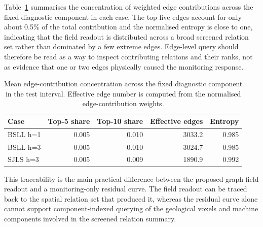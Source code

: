 Table~\ref{tab:edge_concentration} summarises the concentration of weighted
edge contributions across the fixed diagnostic component in each case. The
top five edges account for only about 0.5\% of the total contribution and the
normalised entropy is close to one, indicating that the field readout is
distributed across a broad screened relation set rather than dominated by a
few extreme edges. Edge-level query should therefore be read as a way to
inspect contributing relations and their ranks, not as evidence that one or
two edges physically caused the monitoring response.

\begin{table}[htbp]
\centering
\caption{Mean edge-contribution concentration across the fixed diagnostic
component in the test interval. Effective edge number is computed from the
normalised edge-contribution weights.}
\label{tab:edge_concentration}
\scriptsize
\setlength{\tabcolsep}{4pt}
\begin{tabular}{lrrrr}
\toprule
Case & Top-5 share & Top-10 share & Effective edges & Entropy \\
\midrule
BSLL h=1 & 0.005 & 0.010 & 3033.2 & 0.985 \\
BSLL h=3 & 0.005 & 0.010 & 3024.7 & 0.985 \\
SJLS h=3 & 0.005 & 0.009 & 1890.9 & 0.992 \\
\bottomrule
\end{tabular}
\end{table}

This traceability is the main practical difference between the proposed graph
field readout and a monitoring-only residual curve. The field readout can be
traced back to the spatial relation set that produced it, whereas the residual
curve alone cannot support component-indexed querying of the geological voxels
and machine components involved in the screened relation summary.
